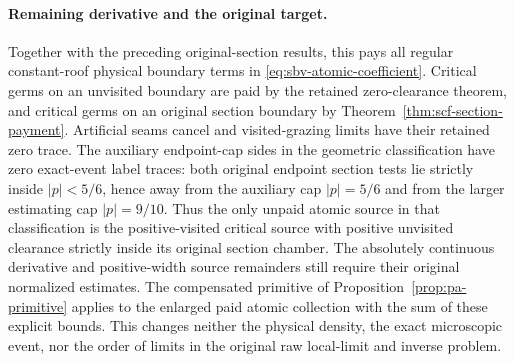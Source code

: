\paragraph{Remaining derivative and the original target.}
Together with the preceding original-section results, this pays
all regular constant-roof physical boundary terms in
\eqref{eq:sbv-atomic-coefficient}. Critical germs on an unvisited
boundary are paid by the retained zero-clearance theorem, and
critical germs on an original section boundary by
Theorem~\ref{thm:scf-section-payment}. Artificial seams cancel
and visited-grazing limits have their retained zero trace.
The auxiliary endpoint-cap sides in the geometric classification
have zero exact-event label traces: both original endpoint
section tests lie strictly inside $|p|<5/6$, hence away from
the auxiliary cap $|p|=5/6$ and from the larger estimating
cap $|p|=9/10$.
Thus the only unpaid atomic source in that classification is
the positive-visited critical source with positive unvisited
clearance strictly inside its original section chamber.
The absolutely continuous derivative and positive-width source
remainders still require their original normalized estimates.
The compensated primitive of Proposition~\ref{prop:pa-primitive}
applies to the enlarged paid atomic collection with the sum of
these explicit bounds. This changes neither the physical density,
the exact microscopic event, nor the order of limits in the
original raw local-limit and inverse problem.
